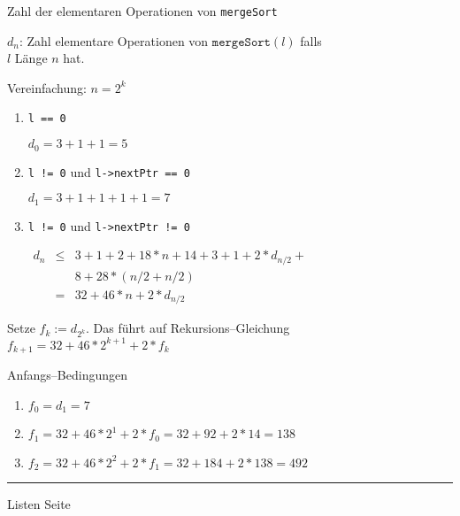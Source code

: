 
\begin{slide}{}
\normalsize

\begin{center}
Zahl der elementaren Operationen von \texttt{mergeSort}
\end{center}
\vspace*{0.5cm}

\footnotesize
$d_n$: Zahl elementare Operationen von $\texttt{mergeSort}(l)$ falls \\
\hspace*{1.3cm} $l$ L\"ange $n$ hat.

Vereinfachung: $n = 2^k$
\begin{enumerate}
\item \texttt{l == 0}
    
       $d_0 = 3 + 1 + 1 = 5$
\item \texttt{l != 0} und \texttt{l->nextPtr == 0}

       $d_1 = 3 + 1 + 1 + 1 + 1 = 7$
\item \texttt{l != 0} und \texttt{l->nextPtr != 0}

      $\begin{array}{lcl}
      d_n &\leq&  3 + 1 + 2 + 18 * n + 14 + 3 + 1 + 2* d_{n/2} +\\
          &    & 8 + 28*(n/2 + n/2) \\[0.3cm]
          & =  &  32 + 46 * n +  2* d_{n/2}  
      \end{array}$

\end{enumerate}
Setze $f_k := d_{2^k}$. Das f\"uhrt auf Rekursions--Gleichung \\[0.3cm]
\hspace*{1.3cm} $f_{k+1} = 32 + 46 * 2^{k+1} + 2 * f_k$ 

Anfangs--Bedingungen
\begin{enumerate}
\item $f_0 = d_1 = 7$
\item $f_1 = 32 + 46 * 2^1 + 2 * f_0 = 32 + 92 + 2*14 = 138$
\item $f_2 = 32 + 46 * 2^2 + 2 * f_1 = 32 + 184 + 2 * 138 = 492$
\end{enumerate}


\vspace*{\fill}
\tiny \addtocounter{mypage}{1}
\rule{17cm}{1mm}
Listen  \hspace*{\fill} Seite 
\end{slide}

